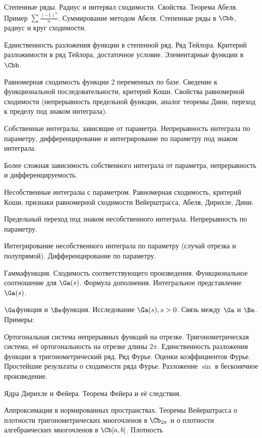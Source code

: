 \documentclass[a4paper]{article}
\begin{document}
\begin{nums}{-2}
\item Степенные ряды. Радиус и интервал сходимости. Свойства. Теорема Абеля. Пример $\sum \frac{(-1)^n}{n}$.
Суммирование методом
Абеля. Степенные ряды в $\Cbb$, радиус и круг сходимости.
\item Единственность разложения функции в степенной ряд. Ряд Тейлора. Критерий разложимости в ряд Тейлора,
достаточное условие.
Элементарные функции в $\Cbb$.
\item Равномерная сходимость функции 2 переменных по базе. Сведение к функциональной последовательности, критерий Коши.
Свойства равномерной сходимости (непрерывность предельной функции, аналог теоремы Дини, переход к пределу под
знаком интеграла).
\item Собственные интегралы, зависящие от параметра. Непрерывность интеграла по параметру, дифференцирование и
интегрирование по параметру под знаком интеграла.
\item Более сложная зависимость собственного интеграла от параметра, непрерывность и дифференцируемость.
\item Несобственные интегралы с параметром. Равномерная сходимость, критерий Коши, признаки равномерной сходимости
Вейерштрасса, Абеля, Дирихле, Дини.
\item Предельный переход под знаком несобственного интеграла. Непрерывность по параметру.
\item Интегрирование несобственного интеграла по параметру (случай отрезка и полупрямой). Дифференцирование по параметру.
\item Гамма\д функция. Сходимость соответствующего произведения. Функциональное соотношение для $\Ga(s)$. Формула
дополнения. Интегральное представление $\Ga(s)$.
\item $\Ga$\д функция и $\Be$\д функция. Исследование $\Ga(s), s > 0$. Связь между $\Ga$ и $\Be$. Примеры:
\item Ортогональная система непрерывных функций на отрезке. Тригонометрическая система, её ортогональность на отрезке
длины $2\pi$. Единственность разложения функции в тригонометрический ряд. Ряд Фурье. Оценки коэффициентов Фурье.
Простейшие результаты о сходимости ряда Фурье. Разложение $\sin$ в бесконечное произведение.
\item Ядра Дирихле и Фейера. Теорема Фейера и её следствия.
\item Аппроксимация в нормированных пространствах. Теоремы Вейерштрасса о плотности тригонометрических
многочленов в $\Cb_{2\pi}$ и о плотности алгебраических многочленов в $\Cb[a,b]$.  Плотность

\end{nums}
\end{document}
